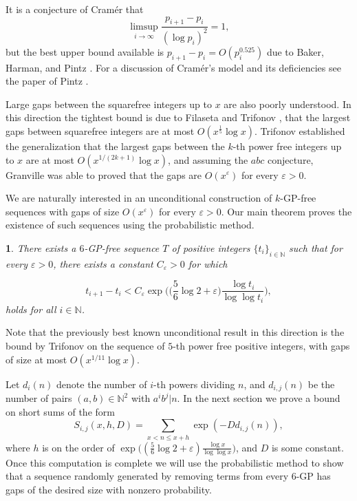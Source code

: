 \documentclass[12pt,english,BCOR7.5mm]{amsart}
\numberwithin{equation}{section}
\numberwithin{figure}{section}
\theoremstyle{definition}
\theoremstyle{plain}
\newtheorem{thm}{\protect\theoremname}
\theoremstyle{plain}
\theoremstyle{plain}
\theoremstyle{definition}
\theoremstyle{plain}
\theoremstyle{plain}
\providecommand{\theoremname}{Theorem}
\begin{document}
It is a conjecture of Cramér \cite{Cramer} that
\[
\limsup_{i\rightarrow\infty}\frac{p_{i+1}-p_{i}}{(\log p_{i})^{2}}=1,
\]
but the best upper bound available is $p_{i+1}-p_{i}=O(p_{i}^{0.525})$
due to Baker, Harman, and Pintz \cite{BHP}. For a discussion of Cramér's
model and its deficiencies see the paper of Pintz \cite{Pintz}.

Large gaps between the squarefree integers up to $x$ are also poorly
understood. In this direction the tightest bound is due to Filaseta
and Trifonov \cite{FT}, that the largest gaps between squarefree
integers are at most $O(x^{\frac{1}{5}}\log x)$. Trifonov \cite{Trifonov}
established the generalization that the largest gaps between the $k$-th
power free integers up to $x$ are at most $O(x^{1/(2k+1)}\log x)$,
and assuming the \emph{$abc$} conjecture, Granville \cite{Granville}
was able to proved that the gaps are $O(x^{\varepsilon})$ for every
$\varepsilon>0$.

We are naturally interested in an unconditional construction of $k$-GP-free
sequences with gaps of size $O(x^{\varepsilon})$ for every $\varepsilon>0$.
Our main theorem proves the existence of such sequences using the
probabilistic method.
\begin{thm}
\label{thm:main}There exists a $6$-GP-free sequence $T$ of positive
integers $\{t_{i}\}_{i\in\mathbb{N}}$ such that for every $\varepsilon>0$,
there exists a constant $C_{\varepsilon}>0$ for which

\[
t_{i+1}-t_{i}<C_{\varepsilon}\exp\Big(\Big(\frac{5}{6}\log2+\varepsilon\Big)\frac{\log t_{i}}{\log\log t_{i}}\Big),
\]
holds for all $i\in\mathbb{N}$.
\end{thm}
Note that the previously best known unconditional result in this direction
is the bound by Trifonov on the sequence of $5$-th power free positive
integers, with gaps of size at most $O(x^{1/11}\log x)$. 

Let $d_{i}(n)$ denote the number of $i$-th powers dividing $n$,
and $d_{i,j}(n)$ be the number of pairs $(a,b)\in\mathbb{N}^{2}$
with $a^{i}b^{j}|n$. In the next section we prove a bound on short
sums of the form
\[
S_{i,j}(x,h,D)=\sum_{x<n\leq x+h}\exp(-Dd_{i,j}(n)),
\]
where $h$ is on the order of $\exp\Big((\frac{5}{6}\log2+\varepsilon)\frac{\log x}{\log\log x}\Big)$,
and $D$ is some constant. Once this computation is complete we will
use the probabilistic method to show that a sequence randomly generated
by removing terms from every $6$-GP has gaps of the desired size
with nonzero probability.
\end{document}
